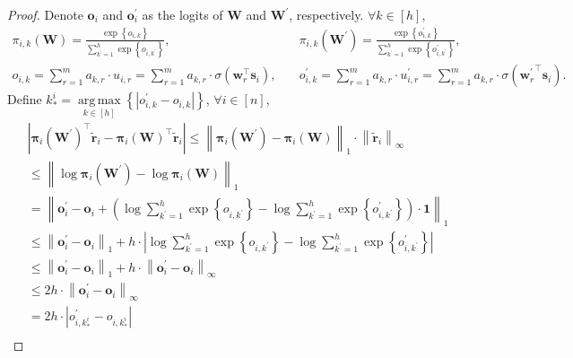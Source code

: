 \documentclass[10pt]{article}
\def\rvo{{\mathbf{o}}}
\def\rvs{{\mathbf{s}}}
\def\rvw{{\mathbf{w}}}
\def\rvo{{\mathbf{o}}}
\def\rvone{{\mathbf{1}}}
\def\rvtilder{{\tilde{\mathbf{r}}}}
\def\rvpi{{\boldsymbol{\pi}}}
\def\rmW{{\mathbf{W}}}
\DeclareMathOperator*{\argmax}{arg\,max}
\begin{document}
\begin{proof}
    Denote $\rvo_i$ and $\rvo_i^\prime$ as the logits of $\rmW$ and $\rmW^\prime$, respectively. $\forall k \in [h]$,
\begin{equation*}
\begin{split}
    \pi_{i,k}\left( \rmW \right) = \frac{\exp\left\{ o_{i,k} \right\}}{\sum\limits_{k^\prime=1}^{h}{ \exp\left\{ o_{i,k^\prime} \right\} }}, &\quad \pi_{i,k}\left( \rmW^\prime \right) = \frac{\exp\left\{ o_{i,k}^\prime \right\}}{\sum\limits_{k^\prime=1}^{h}{ \exp\left\{ o_{i,k^\prime}^\prime \right\} }}, \\
    o_{i,k} = \sum\limits_{r=1}^{m}{a_{k,r} \cdot u_{i,r}} = \sum\limits_{r=1}^{m}{a_{k,r} \cdot \sigma\left( \rvw_r^\top \rvs_i \right)}, &\quad o_{i,k}^\prime = \sum\limits_{r=1}^{m}{a_{k,r} \cdot u_{i,r}^\prime} = \sum\limits_{r=1}^{m}{a_{k,r} \cdot \sigma\left( {\rvw_r^\prime}^\top \rvs_i \right)}.
\end{split}
\end{equation*}
Define $k_*^i = \argmax\limits_{k \in [h]}\left\{ \left| o_{i,k}^\prime - o_{i,k} \right| \right\}$, $\forall i \in [n]$,
\begin{equation*}
\begin{split}
    &\left| \rvpi_i\left( \rmW^\prime \right)^\top \rvtilder_i - \rvpi_i\left( \rmW \right)^\top \rvtilder_i \right| \le \left\| \rvpi_i\left( \rmW^\prime \right) - \rvpi_i\left( \rmW \right) \right\|_1 \cdot \left\| \rvtilder_i \right\|_\infty \\
    &\le \left\| \log{ \rvpi_i\left( \rmW^\prime \right)} - \log{ \rvpi_i\left( \rmW \right) }  \right\|_1 \\
    &= \left\| \rvo_i^\prime - \rvo_i + \left( \log{ \sum\limits_{k^\prime=1}^{h}{ \exp\left\{ o_{i,k^\prime} \right\} } } - \log{ \sum\limits_{k^\prime=1}^{h}{ \exp\left\{ o_{i,k^\prime}^\prime \right\} } } \right) \cdot \rvone\right\|_1 \\
    &\le \left\| \rvo_i^\prime - \rvo_i \right\|_1 + h \cdot \left| \log{ \sum\limits_{k^\prime=1}^{h}{ \exp\left\{ o_{i,k^\prime} \right\} } } - \log{ \sum\limits_{k^\prime=1}^{h}{ \exp\left\{ o_{i,k^\prime}^\prime \right\} } } \right| \\
    &\le \left\| \rvo_i^\prime - \rvo_i \right\|_1 + h \cdot \left\| \rvo_i^\prime - \rvo_i \right\|_\infty \\
    &\le 2 h \cdot \left\| \rvo_i^\prime - \rvo_i \right\|_\infty \\
    &= 2 h \cdot \left| o_{i,k_*^i}^\prime - o_{i,k_*^i} \right| \\

\end{split}
\end{equation*}
\end{proof}
\end{document}
